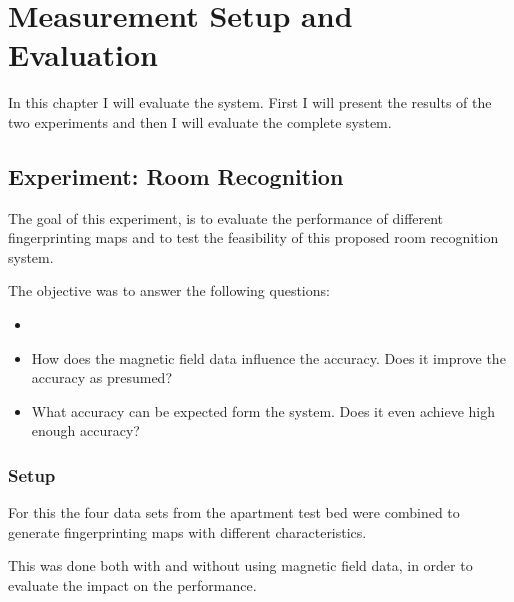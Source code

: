 \chapter{Measurement Setup and Evaluation}
\newcommand{\rd}[1]{\textcolor{red}{#1}}
\newcommand{\gn}[1]{\textcolor{green}{#1}}

\label{Chapter5}


In this chapter I will evaluate the system. First I will present the results of the two experiments and then I will evaluate the complete system.

\section{Experiment: Room Recognition}
The goal of this experiment, is to evaluate the performance of different fingerprinting maps and to test the feasibility of this proposed room recognition system.

The objective was to answer the following questions:
\begin{itemize}
\item {}
\item How does the magnetic field data influence the accuracy. Does it improve the accuracy as presumed?
\item What accuracy can be expected form the system. Does it even achieve high enough accuracy?
\end{itemize}

\subsection{Setup}
For this the four data sets from the apartment test bed were combined to generate fingerprinting maps with different characteristics. 

This was done both with and without using magnetic field data, in order to evaluate the impact  on the performance.

